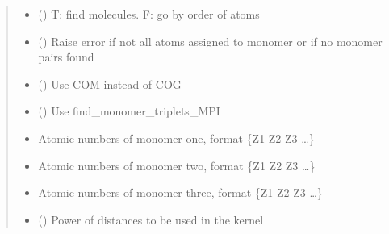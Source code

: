 \documentclass[letterpaper,10pt,english]{sphinxmanual}
\begin{document}
\begin{fulllineitems}
\begin{quote}
\begin{description}
\begin{itemize}
\item {} 
 () \textendash{} T: find molecules. F: go by order of atoms

\item {} 
 () \textendash{} Raise error if not all atoms assigned to monomer or if no monomer pairs found

\item {} 
 () \textendash{} Use COM instead of COG

\item {} 
 () \textendash{} Use find\_monomer\_triplets\_MPI

\item {} 
 \textendash{} Atomic numbers of monomer one, format \{Z1 Z2 Z3 …\}

\item {} 
 \textendash{} Atomic numbers of monomer two, format \{Z1 Z2 Z3 …\}

\item {} 
 \textendash{} Atomic numbers of monomer three, format \{Z1 Z2 Z3 …\}

\item {} 
 () \textendash{} Power of distances to be used in the kernel

\end{itemize}

\end{description}\end{quote}

\end{fulllineitems}

\end{document}
